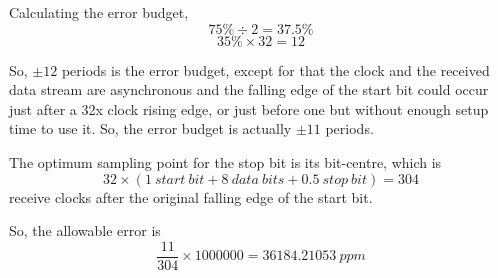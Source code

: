 \begin{comment}
\begin{align*}
  \frac{\SI{1500}{bytes} \times \SI{8}{bits/byte}}{\SI{115200}{bits/\second}}&=
  \frac{5}{48}\SI{}{\second}
\end{align*}
\end{comment}


Calculating the error budget, \footnotemark
\[75\% \div 2 = 37.5\%\]
\[35\% \times 32 = 12\]

So, \(\pm 12\) periods is the error budget, except for that the
clock and the received data stream are asynchronous and the falling edge of the
start bit could occur just after a 32x clock rising edge, or just before one but
without enough setup time to use it. So, the error budget is actually \(\pm
11\) periods.

The optimum sampling point for the stop bit is its bit-centre,
which is
\[32 \times (1~start~bit + 8~data~bits + 0.5~stop~bit) = 304 \]
receive clocks after the original falling edge of the start bit.

So, the allowable error is
\[\frac{11}{304} \times 1000000 = 36184.21053~ppm\]
